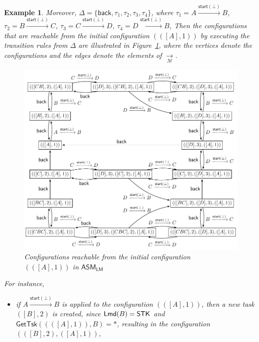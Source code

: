 \documentclass[preprint,12pt]{elsarticle}
\newtheorem{example}{Example}
\newcommand\Mm{{\mathcal{M} }}
\newcommand\lmd{{\sf Lmd}}
\newcommand{\LMAMASS}{\textsf{ASM}_\textsf{LM}}
\newcommand\back{{\mathsf{back} }}
\newcommand\startactivity{{\mathsf{start} }}
\newcommand{\STK}{\mathsf{STK}}
\newcommand{\STP}{\mathsf{STP}}
\newcommand\gettsk{\mathsf{GetTsk}}
\begin{document}
\begin{example}
		Moreover, $\Delta = \{\back,\tau_1, \tau_2, \tau_3, \tau_4\}$, where 
		$\tau_1 = A \xrightarrow{\startactivity(\bot)} B$,
		$\tau_2 = B \xrightarrow{\startactivity(\bot)} C$,
		$\tau_3 = C \xrightarrow{\startactivity(\bot)} D$,
		$\tau_4 = D \xrightarrow{\startactivity(\bot)} B$,
		Then the configurations that are reachable from the initial configuration $(([A], 1))$ by executing the transition rules from $\Delta$ are illustrated in Figure~\ref{lmasm-example}, where the vertices denote the configurations and the edges denote the elements of $\xrightarrow[\Mm]{}$. 
		\begin{figure}[t]
			\centering
			\includegraphics[scale = 0.75]{lmasm-example.pdf}
			\caption{Configurations reachable from the initial configuration $(([A], 1))$ in $\LMAMASS$}
			\label{lmasm-example}
		\end{figure}
		For instance, 
		\begin{itemize}
			\item if $A \xrightarrow{\startactivity(\bot)} B$ is applied to the configuration $(([A], 1))$, then a new task $([B],2)$ is created, since $\lmd(B) = \STK$ and $\gettsk((([A],1)), B) = *$, resulting in the configuration $(([B],2),([A],1))$,

\end{itemize}
\end{example}
\end{document}
